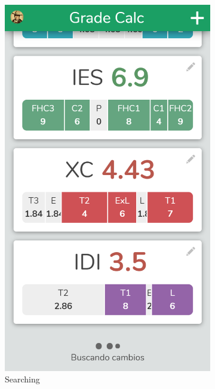 \begin{figure}[ht!]
\begin{subfigure}[b]{0.3333\textwidth-0.1cm}
        \includegraphics[width=\textwidth]{media/screenshots/screenshot-loader-buscando.png}
        \caption{Searching}
    \end{subfigure}
    \hfill
    \begin{subfigure}[b]{0.3333\textwidth-0.1cm}
        \centering

\end{subfigure}
\end{figure}
